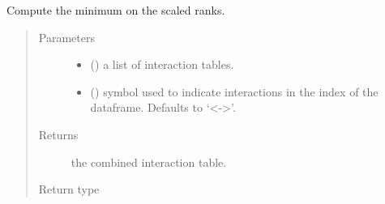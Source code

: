 \documentclass[letterpaper,10pt,english]{sphinxmanual}
\begin{document}
\begin{fulllineitems}
\label{\detokenize{_modules/cosifer.combiners:cosifer.combiners.cit.min_scaled_ranks_table}}
Compute the minimum on the scaled ranks.
\begin{quote}\begin{description}
\item[{Parameters}] \leavevmode\begin{itemize}
\item {} 
 () \textendash{} a list of interaction tables.

\item {} 
 (\sphinxstyleliteralemphasis{\sphinxupquote{, }}) \textendash{} symbol used to indicate
interactions in the index of the dataframe. Defaults to ‘\textless{}-\textgreater{}’.

\end{itemize}

\item[{Returns}] \leavevmode
the combined interaction table.

\item[{Return type}] \leavevmode
{\hyperref[\detokenize{_modules/cosifer.collections:cosifer.collections.interaction_table.InteractionTable}]{}}

\end{description}\end{quote}

\end{fulllineitems}

\end{document}
